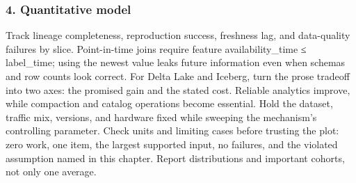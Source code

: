\subsubsection*{4. Quantitative model}
Track lineage completeness, reproduction success, freshness lag, and data-quality failures by slice. Point-in-time joins require feature availability\_time ≤ label\_time; using the newest value leaks future information even when schemas and row counts look correct.
For Delta Lake and Iceberg, turn the prose tradeoff into two axes: the promised gain and the stated cost. Reliable analytics improve, while compaction and catalog operations become essential. Hold the dataset, traffic mix, versions, and hardware fixed while sweeping the mechanism's controlling parameter.
Check units and limiting cases before trusting the plot: zero work, one item, the largest supported input, no failures, and the violated assumption named in this chapter. Report distributions and important cohorts, not only one average.
